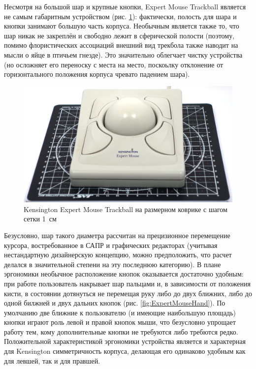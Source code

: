 \documentclass[11pt, a4paper]{article}
\begin{document}
Несмотря на большой шар и крупные кнопки, Expert Mouse Trackball является не самым габаритным устройством (рис. \ref{fig:ExpertMouseSize}): фактически, полость для шара и кнопки занимают большую часть корпуса. Необычным является также то, что шар никак не закреплён и свободно лежит в сферической полости (поэтому, помимо флористических ассоциаций внешний вид трекбола также наводит на мысли о яйце в птичьем гнезде). Это значительно облегчает чистку устройства (но осложняет его переноску с места на место, поскоьлку  отклонение от горизонтального положения корпуса чревато падением шара).

\begin{figure}[h]
    \centering
    \includegraphics[scale=0.3]{1996_kensington_expert_trackball_5/size_30.jpg}
    \caption{Kensington Expert Mouse Trackball на размерном коврике с шагом сетки 1~см}
    \label{fig:ExpertMouseSize}
\end{figure}

Безусловно, шар такого диаметра рассчитан на прецизионное перемещение курсора, востребованное в САПР и графических редакторах (учитывая нестандартную дизайнерскую концепцию, можно предположить, что расчет делался в значительной степени на эту последнюю категорию). В плане эргономики необычное расположение кнопок оказывается достаточно удобным: при работе пользователь накрывает шар пальцами и, в зависимости от положения кисти, в состоянии дотянуться не перемещая руку либо до двух ближних, либо до одной билжней и двух дальних кнопок (рис. \ref{fig:ExpertMouseHand}). По умолчанию две ближние к пользователю (и имеющие наибольшую площадь) кнопки играют роль левой и правой кнопок мыши, что безусловно упрощает работу тем, кому дополнительные кнопки не требуются либо требются редко. Положительной характеристикой эргономики устройства является и характерная для Kensington  симметричность корпуса, делающая его одинаково удобным как для левшей, так и для правшей.
\end{document}
